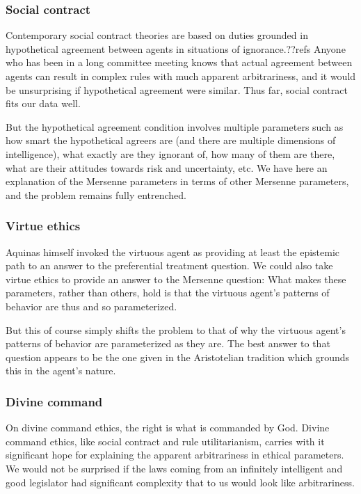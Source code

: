 \subsubsection{Social contract}
Contemporary social contract theories are based on duties grounded in hypothetical agreement between agents in situations of 
ignorance.??refs Anyone who has been in a long committee meeting knows that actual agreement between agents can result in 
complex rules with much apparent arbitrariness, and it would be unsurprising if hypothetical agreement were similar. Thus far, 
social contract fits our data well. 

But the hypothetical agreement condition involves multiple parameters such as how smart the hypothetical agreers are (and there are
multiple dimensions of intelligence), what exactly are they ignorant of, how many of them are there, what are their attitudes towards
risk and uncertainty, etc. We have here an explanation of the Mersenne parameters in terms of other Mersenne parameters, and the
problem remains fully entrenched. 

\subsubsection{Virtue ethics}
Aquinas himself invoked the virtuous agent as providing at least the epistemic path to an answer to the preferential treatment
question. We could also take virtue ethics to provide an answer to the Mersenne question: What makes these parameters, rather
than others, hold is that the virtuous agent's patterns of behavior are thus and so parameterized.

But this of course simply shifts the problem to that of why the virtuous agent's patterns of behavior are parameterized as
they are. The best answer to that question appears to be the one given in the Aristotelian tradition which grounds this in
the agent's nature.

\subsubsection{Divine command}
On divine command ethics, the right is what is commanded by God.
Divine command ethics, like social contract and rule utilitarianism, carries with it significant hope for explaining the apparent
arbitrariness in ethical parameters. We would not be surprised if the laws coming from an infinitely intelligent and good legislator 
had significant complexity that to us would look like arbitrariness. 

